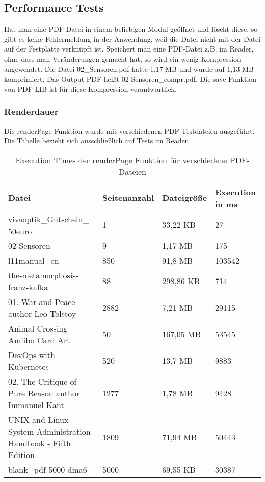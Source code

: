 \subsection{Performance Tests}
Hat man eine PDF-Datei in einem beliebigen Modul geöffnet und löscht diese, so gibt es keine Fehlermeldung in der Anwendung, weil die Datei nicht mit der Datei auf der Festplatte verknüpft ist. Speichert man eine PDF-Datei z.B. im Reader, ohne dass man Veränderungen gemacht hat, so wird ein wenig Kompression angewendet. Die Datei 02\_Sensoren.pdf hatte 1,17 MB und wurde auf 1,13 MB komprimiert. Das Output-PDF heißt 02-Sensoren\_compr.pdf. Die save-Funktion von PDF-LIB ist für diese Kompression verantwortlich. 

\subsubsection{Renderdauer}
Die renderPage Funktion wurde mit verschiedenen PDF-Testdateien ausgeführt. Die Tabelle bezieht sich ausschließlich auf Tests im Reader. 

\begin{table}[!htbp]
	\centering
	\begin{tabular}{|p{4cm}|p{3cm}|p{3cm}|p{3cm}|}
		\hline
		\textbf{Datei}													& \textbf{Seitenanzahl} 	& \textbf{Dateigröße} 	& \textbf{Execution in ms}	\\ 
		\hline
		\parbox[t]{4cm}{vivaoptik\_Gutschein\_\\50euro}					& 1 						& 33,22 KB  			& 27						\\ 
		02-Sensoren														& 9 						& 1,17 MB  				& 175						\\ 
		l11manual\_en 													& 850 						& 91,8 MB  				& 103542						\\
		the-metamorphosis-franz-kafka 									& 88 						& 298,86 KB  			& 714						\\ 
		01. War and Peace author Leo Tolstoy 							& 2882 						& 7,21 MB  				& 29115						\\ 
		Animal Crossing Amiibo Card Art									& 50 						& 167,05 MB  			& 53545						\\  
		DevOps with Kubernetes											& 520 						& 13,7 MB  				& 9883						\\  
		02. The Critique of Pure Reason author Immanuel Kant			& 1277 						& 1,78 MB  				& 9428						\\  
		UNIX and Linux System Administration Handbook - Fifth Edition	& 1809						& 71,94 MB  			& 50443 						\\ 
		blank\_pdf-5000-dina6											& 5000						& 69,55 KB  			& 30387						\\ 
		\hline
	\end{tabular}
	\caption{Execution Times der renderPage Funktion für verschiedene PDF-Dateien}
	\label{table:render-dur}
\end{table}

